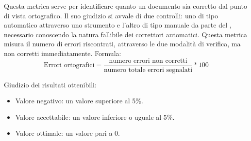 \documentclass[a4paper, titlepage]{article}
\begin{document}
\label{par:errort}
Questa metrica serve per identificare quanto un documento sia corretto dal punto di vista ortografico. Il suo giudizio si avvale di due controlli: uno di tipo automatico attraverso uno strumento  e l'altro di tipo manuale da parte del , necessario conoscendo la natura fallibile dei correttori automatici.
\newline Questa metrica misura il numero di errori riscontrati, attraverso le due modalità di verifica, ma non corretti immediatamente.
\newline Formula:
\begin{displaymath}
\mbox{Errori ortografici}= \frac{\mbox{numero errori non corretti}}{\mbox{numero totale errori segnalati}}*100
\end{displaymath}
\par Giudizio dei risultati ottenibili:
\begin{itemize}
\item Valore negativo: un valore superiore al 5\%. 
\item Valore accettabile: un valore inferiore o uguale al 5\%.
\item Valore ottimale: un valore pari a 0.
\end{itemize}
\end{document}

